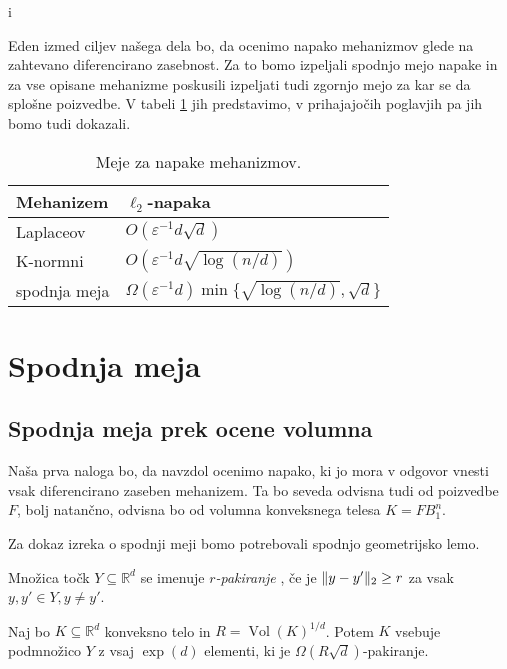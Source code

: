 i\documentclass[mat1]{fmfdelo}
\DeclarePairedDelimiter{\norm}{\lVert}{\rVert}
\newcommand{\R}{\mathbb R}
\DeclareMathOperator{\Vol}{Vol}
\begin{document}
Eden izmed ciljev našega dela bo, da ocenimo napako mehanizmov glede na zahtevano diferencirano zasebnost. Za to bomo izpeljali spodnjo mejo napake in za vse opisane mehanizme poskusili izpeljati tudi zgornjo mejo za kar se da splošne poizvedbe. V tabeli \ref{boundtable} jih predstavimo, v prihajajočih poglavjih pa jih bomo tudi dokazali.

\begin{table}[h]
	\begin{tabular}{|l|l|}
		\hline
		\textbf{Mehanizem} & \textbf{$\ell_2$-napaka} \\ \hline
		Laplaceov           & $O(\varepsilon^{-1} d \sqrt{d})$ \\ \hline
		K-normni            & $O(\varepsilon^{-1} d \sqrt{\log(n/d)})$ \\ \hline
		spodnja meja       & $\Omega(\varepsilon^{-1}d) \min\{\sqrt{\log(n/d)}, \sqrt{d}\}$                  \\ \hline
	\end{tabular}
	
	\caption{Meje za napake mehanizmov.} \label{boundtable}
\end{table}

\section{Spodnja meja}

\subsection{Spodnja meja prek ocene volumna}

Naša prva naloga bo, da navzdol ocenimo napako, ki jo mora v odgovor vnesti vsak diferencirano zaseben mehanizem. Ta bo seveda odvisna tudi od poizvedbe $F$, bolj natančno, odvisna bo od volumna konveksnega telesa $K=FB_1^n$.

Za dokaz izreka o spodnji meji bomo potrebovali spodnjo geometrijsko lemo.

\begin{definicija}
	Množica točk $Y \subseteq \R^d$ se imenuje {\em $r$-pakiranje }, če je $\norm{y-y'}_2 \geq r$ za vsak $y, y' \in Y, y \neq y'$.
\end{definicija}

\begin{lema} \label{r-packing}
	Naj bo $K \subseteq \R^d$ konveksno telo in $R=\Vol(K)^{1/d}$. Potem $K$ vsebuje podmnožico $Y$ z vsaj $\exp(d)$ elementi, ki je $\Omega(R\sqrt{d})$-pakiranje.
\end{lema}
\end{document}
